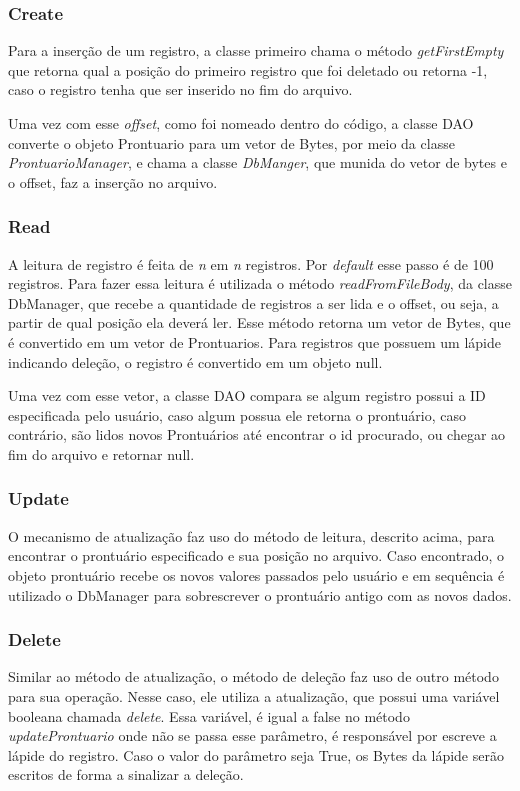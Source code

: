 \subsubsection{\esp Create}
Para a inserção de um registro, a classe primeiro chama o método \textit{getFirstEmpty} que retorna qual a posição do primeiro registro que foi deletado ou retorna -1, caso o registro tenha que ser inserido no fim do arquivo. 

Uma vez com esse \textit{offset}, como foi nomeado dentro do código, a classe DAO converte o objeto Prontuario para um vetor de Bytes, por meio da classe \textit{ProntuarioManager}, e chama a classe \textit{DbManger}, que munida do vetor de bytes e o offset, faz a inserção no arquivo.

\subsubsection{\esp Read}
A leitura de registro é feita de \textit{n} em \textit{n} registros. Por \textit{default} esse passo é de 100 registros. Para fazer essa leitura é utilizada o método \textit{readFromFileBody}, da classe DbManager, que recebe a quantidade de registros a ser lida e o offset, ou seja, a partir de qual posição ela deverá ler. Esse método retorna um vetor de Bytes, que é convertido em um vetor de Prontuarios. Para registros que possuem um lápide indicando deleção, o registro é convertido em um objeto null.

Uma vez com esse vetor, a classe DAO compara se algum registro possui a ID especificada pelo usuário, caso algum possua ele retorna o prontuário, caso contrário, são lidos novos Prontuários até encontrar o id procurado, ou chegar ao fim do arquivo e retornar null.

\subsubsection{\esp Update}
O mecanismo de atualização faz uso do método de leitura, descrito acima, para encontrar o prontuário especificado e sua posição no arquivo. Caso encontrado, o objeto prontuário recebe os novos valores passados pelo usuário e em sequência é utilizado o DbManager para sobrescrever o prontuário antigo com as novos dados.

\subsubsection{\esp Delete}
Similar ao método de atualização, o método de deleção faz uso de outro método para sua operação. Nesse caso, ele utiliza a atualização, que possui uma variável booleana chamada \textit{delete}. Essa variável, é igual a false no método \textit{updateProntuario} onde não se passa esse parâmetro, é responsável por escreve a lápide do registro. Caso o valor do parâmetro seja True, os Bytes da lápide serão escritos de forma a sinalizar a deleção.
